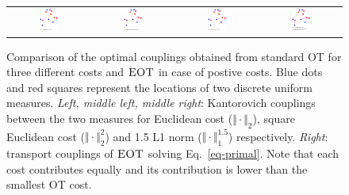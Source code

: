 \begin{figure}[h!]
\begin{tabular}{@{}c@{}c@{}c@{}c@{}}
\includegraphics[width=0.25\textwidth]{figures/primal_W_1_norm.pdf}&
\includegraphics[width=0.25\textwidth]{figures/primal_W_2_norm.pdf}&
\includegraphics[width=0.25\textwidth]{figures/primal_W_3_norm.pdf}&
\includegraphics[width=0.25\textwidth]{figures/primal_W_1_2_3_norm.pdf}
\end{tabular}
\caption{Comparison of the optimal couplings obtained from standard OT for three different costs and $\textsc{EOT}$ in case of postive costs. Blue dots and red squares represent the locations of two discrete uniform measures. \emph{Left, middle left, middle right}: Kantorovich couplings between the two measures for Euclidean cost  ($\Vert\cdot\Vert_2$), square Euclidean cost ($\Vert\cdot\Vert_2^{2}$) and 1.5 L1 norm ($\Vert\cdot\Vert_1^{1.5}$) respectively. \emph{Right}: transport couplings of $\textsc{EOT}$ solving Eq.~\eqref{eq-primal}. Note that each cost contributes equally and its contribution is lower than the smallest OT cost.}
\label{fig:transport-map-ot-view}
\end{figure}


